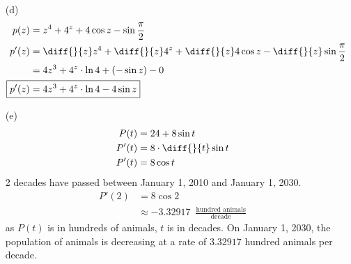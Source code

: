 \documentclass{article}
\begin{document}
\begin{itemize}
\item[(d)]
    \begin{align*}
        p(z)&=z^4+4^z+4\cos z-\sin\frac{\pi}{2} \\
        p'(z)&=\diff{}{z}z^4+\diff{}{z}4^z+\diff{}{z}4\cos z-\diff{}{z}\sin\frac{\pi}{2} \\
        &=4z^3+4^z\cdot\ln{4}+\left(-\sin z\right)-0 \\
        \Aboxed{p'(z)&=4z^3+4^z\cdot\ln{4}-4\sin z} \\
    \end{align*}

\item[(e)]
    \begin{align*}
        P(t)&=24+8\sin t \\
        P'(t)&=8\cdot\diff{}{t}\sin t \\
        P'(t)&=8\cos t
    \end{align*}
    2 decades have passed between January 1, 2010 and January 1, 2030.
    \begin{align*}
        P'(2)&=8\cos2 \\
        &\approx-3.32917\enspace\frac{\text{hundred animals}}{\text{decade}}
    \end{align*}
    as $P(t)$ is in hundreds of animals, $t$ is in decades. On January 1, 2030, the population of animals is decreasing at a rate of $3.32917$ hundred animals per decade.
\end{itemize}
\end{document}
